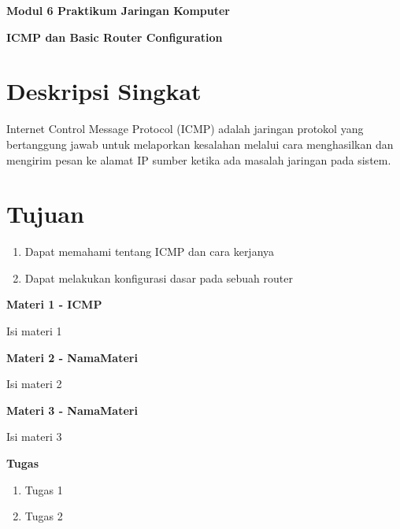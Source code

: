 \documentclass{article}
\begin{document}
    \begin{center}
        \textbf{Modul 6 Praktikum Jaringan Komputer}

        \textbf{ICMP dan Basic Router Configuration}
    \end{center}

    \section*{Deskripsi Singkat}
    \begin{flushleft}
        Internet Control Message Protocol (ICMP) adalah  jaringan protokol yang bertanggung jawab untuk melaporkan kesalahan melalui cara menghasilkan dan mengirim pesan ke alamat IP sumber ketika ada masalah jaringan pada sistem. 
    \end{flushleft}

    \section*{Tujuan}
    \begin{enumerate}
        \item Dapat memahami tentang ICMP dan cara kerjanya
        \item Dapat melakukan konfigurasi dasar pada sebuah router
    \end{enumerate}

    \begin{flushleft}
        \textbf{Materi 1 - ICMP}
        \newline

        Isi materi 1
    \end{flushleft}

    \begin{flushleft}
        \textbf{Materi 2 - NamaMateri}
        \newline

        Isi materi 2
    \end{flushleft}

    \begin{flushleft}
        \textbf{Materi 3 - NamaMateri}
        \newline

        Isi materi 3
    \end{flushleft}

    \newpage
    \begin{flushleft}
        \textbf{Tugas}
        \newline

        \begin{enumerate}
            \item Tugas 1
            \item Tugas 2
        \end{enumerate}
    \end{flushleft}
\end{document}
